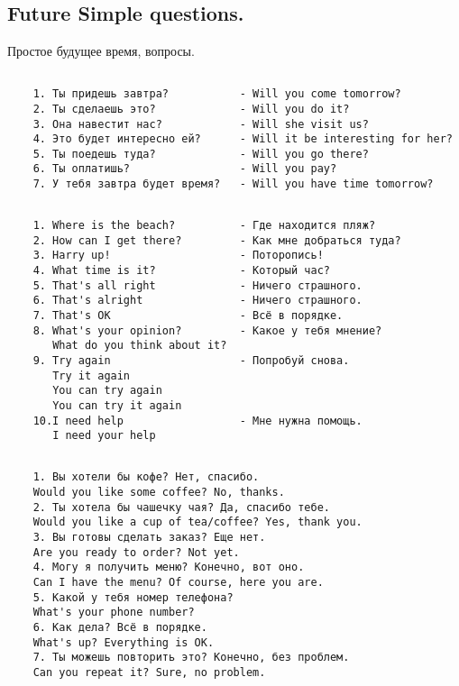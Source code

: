 \subsection{Future Simple questions.}
Простое будущее время, вопросы.
\subsection*{}
\begin{verbatim}
    1. Ты придешь завтра?           - Will you come tomorrow?
    2. Ты сделаешь это?             - Will you do it?
    3. Она навестит нас?            - Will she visit us?
    4. Это будет интересно ей?      - Will it be interesting for her?
    5. Ты поедешь туда?             - Will you go there?
    6. Ты оплатишь?                 - Will you pay?
    7. У тебя завтра будет время?   - Will you have time tomorrow?
\end{verbatim}

\subsection*{}
\begin{verbatim}
    1. Where is the beach?          - Где находится пляж?
    2. How can I get there?         - Как мне добраться туда?
    3. Harry up!                    - Поторопись!
    4. What time is it?             - Который час?
    5. That's all right             - Ничего страшного.
    6. That's alright               - Ничего страшного.
    7. That's OK                    - Всё в порядке.
    8. What's your opinion?         - Какое у тебя мнение?
       What do you think about it?
    9. Try again                    - Попробуй снова.
       Try it again
       You can try again
       You can try it again
    10.I need help                  - Мне нужна помощь.
       I need your help
\end{verbatim}

\subsection*{}
\begin{verbatim}
    1. Вы хотели бы кофе? Нет, спасибо.
    Would you like some coffee? No, thanks.
    2. Ты хотела бы чашечку чая? Да, спасибо тебе.
    Would you like a cup of tea/coffee? Yes, thank you.
    3. Вы готовы сделать заказ? Еще нет.
    Are you ready to order? Not yet.
    4. Могу я получить меню? Конечно, вот оно.
    Can I have the menu? Of course, here you are.
    5. Какой у тебя номер телефона?
    What's your phone number?
    6. Как дела? Всё в порядке.
    What's up? Everything is OK.
    7. Ты можешь повторить это? Конечно, без проблем.
    Can you repeat it? Sure, no problem.
\end{verbatim}

